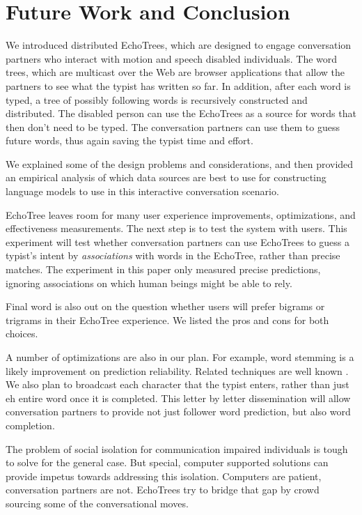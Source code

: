 \documentclass{sigchi}
\begin{document}
\section{Future Work and Conclusion}

We introduced distributed EchoTrees, which are designed to engage
conversation partners who interact with motion and speech disabled
individuals. The word trees, which are multicast over the Web are
browser applications that allow the partners to see what the typist
has written so far. In addition, after each word is typed, a tree of
possibly following words is recursively constructed and distributed. 
The disabled person can use the EchoTrees as a source for words that
then don't need to be typed. The conversation partners can use them to
guess future words, thus again saving the typist time and effort.

We explained some of the design problems and considerations, and then
provided an empirical analysis of which data sources are best to use
for constructing language models to use in this interactive
conversation scenario.

EchoTree leaves room for many user experience improvements,
optimizations, and effectiveness measurements. The next step is to
test the system with users. This experiment will test whether
conversation partners can use EchoTrees to guess a typist's intent by
{\em associations} with words in the EchoTree, rather than precise
matches. The experiment in this paper only measured precise
predictions, ignoring associations on which human beings might be able
to rely.

Final word is also out on the question whether users will prefer
bigrams or trigrams in their EchoTree experience. We listed the pros
and cons for both choices.

A number of optimizations are also in our plan. For example, word
stemming is a likely improvement on prediction reliability. Related
techniques are well known \cite{***porter stemming****}. We also plan
to broadcast each character that the typist enters, rather than just
eh entire word once it is completed. This letter by letter
dissemination will allow conversation partners to provide not just
follower word prediction, but also word completion.

The problem of social isolation for communication impaired individuals
is tough to solve for the general case. But special, computer
supported solutions can provide impetus towards addressing this
isolation. Computers are patient, conversation partners are
not. EchoTrees try to bridge that gap by crowd sourcing some of the
conversational moves.
\end{document}
